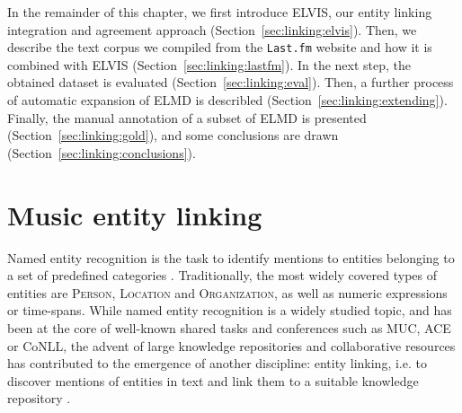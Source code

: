 


In the remainder of this chapter, we first introduce \textsc{ELVIS}, our entity linking integration and agreement approach (Section~\ref{sec:linking:elvis}). Then, we describe the text corpus we compiled from the \texttt{Last.fm} website and how it is combined with ELVIS (Section~\ref{sec:linking:lastfm}). In the next step, the obtained dataset is evaluated (Section~\ref{sec:linking:eval}). Then, a further process of automatic expansion of \textsc{ELMD} is describled (Section~\ref{sec:linking:extending}). Finally, the manual annotation of a subset of \textsc{ELMD} is presented (Section~\ref{sec:linking:gold}), and some conclusions are drawn (Section~\ref{sec:linking:conclusions}). %


\section{Music entity linking}
\label{sec:linking:el}


Named entity recognition is the task to identify mentions to entities belonging to a set of predefined categories \citep{ZhouandJian2002}. Traditionally, the most widely covered types of entities are \textsc{Person}, \textsc{Location} and \textsc{Organization}, as well as numeric expressions or time-spans. While named entity recognition is a widely studied topic, and has been at the core of well-known shared tasks and conferences \citep{Nadeau2007} such as MUC, ACE or CoNLL, the advent of large knowledge repositories and collaborative resources has contributed to the emergence of another discipline: entity linking, i.e. to discover mentions of entities in text and link them to a suitable knowledge repository \citep{Moroetal2014}.

